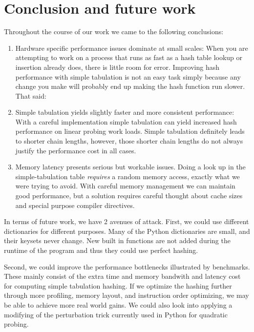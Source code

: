 \documentclass[runningheads,a4paper]{llncs}
\begin{document}
\section{Conclusion and future work}
Throughout the course of our work we came to the following conclusions:
\begin{enumerate}
\item Hardware specific performance issues dominate at small scales: When you
are attempting to work on a process that runs as fast as a hash table lookup or
insertion already does, there is little room for error.  Improving hash
performance with simple tabulation is not an easy task simply because any
change you make will probably end up making the hash function run slower.  That said:

\item Simple tabulation yields slightly faster and more consistent performance:
With a careful implementation simple tabulation can yield increased hash
performance on linear probing work loads. Simple tabulation definitely leads to
shorter chain lengths, however, those shorter chain lengths do not always
justify the performance cost in all cases.

\item Memory latency presents serious but workable issues.  Doing a look up in the simple-tabulation table \emph{requires} a random memory access, exactly what we were trying to avoid. With careful memory management we can maintain good performance, but a solution requires careful thought about cache sizes and special purpose compiler directives.

\end{enumerate}

In terms of future work, we have 2 avenues of attack. First, we could use
different dictionaries for different purposes. Many of the Python dictionaries
are small, and their keysets never change. New built in functions are not added
during the runtime of the program and thus they could use perfect hashing.

Second, we could improve the performance bottlenecks illustrated by benchmarks.
These mainly consist of the extra time and memory bandwith and latency cost for
computing simple tabulation hashing.  If we optimize the hashing further
through more profiling, memory layout, and instruction order optimizing, we may
be able to achieve more real world gains.  We could also look into applying a
modifying of the perturbation trick currently used in Python for quadratic
probing.
\end{document}
